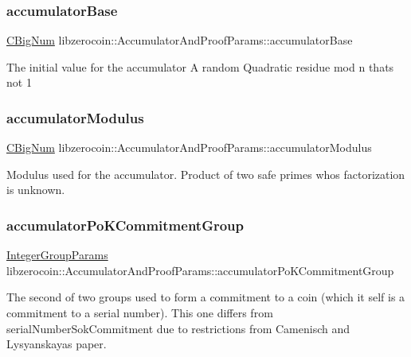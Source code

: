 \subsubsection{\texorpdfstring{accumulatorBase}{accumulatorBase}}
{\footnotesize\ttfamily \mbox{\hyperlink{class_c_big_num}{C\+Big\+Num}} libzerocoin\+::\+Accumulator\+And\+Proof\+Params\+::accumulator\+Base}

The initial value for the accumulator A random Quadratic residue mod n thats not 1 \mbox{\label{classlibzerocoin_1_1_accumulator_and_proof_params_ab85afbda9cf8b90744dedf49636103af}} 
\subsubsection{\texorpdfstring{accumulatorModulus}{accumulatorModulus}}
{\footnotesize\ttfamily \mbox{\hyperlink{class_c_big_num}{C\+Big\+Num}} libzerocoin\+::\+Accumulator\+And\+Proof\+Params\+::accumulator\+Modulus}

Modulus used for the accumulator. Product of two safe primes who\textquotesingle{}s factorization is unknown. \mbox{\label{classlibzerocoin_1_1_accumulator_and_proof_params_a7be9c99e4770069e97e4a7ff17d9845c}} 
\subsubsection{\texorpdfstring{accumulatorPoKCommitmentGroup}{accumulatorPoKCommitmentGroup}}
{\footnotesize\ttfamily \mbox{\hyperlink{classlibzerocoin_1_1_integer_group_params}{Integer\+Group\+Params}} libzerocoin\+::\+Accumulator\+And\+Proof\+Params\+::accumulator\+Po\+K\+Commitment\+Group}

The second of two groups used to form a commitment to a coin (which it self is a commitment to a serial number). This one differs from serial\+Number\+Sok\+Commitment due to restrictions from Camenisch and Lysyanskaya\textquotesingle{}s paper. \mbox{\label{classlibzerocoin_1_1_accumulator_and_proof_params_ab786dbc4efdd8950e5c2591c0bf6de8c}} 
